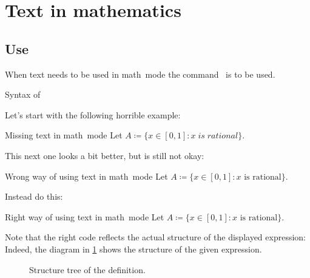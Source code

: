 \section{Text in mathematics}


\subsection{Use }

When text needs to be used in math~mode the command~ is to be used.
\begin{showcode}{Syntax of }
\end{showcode}
Let’s start with the following horrible example:
\begin{showlatex}{Missing text in math~mode}
Let $A \coloneqq \{ x \in [0,1] : x \; is \; rational \}$.
\end{showlatex}
This next one looks a bit better, but is still not okay:
\begin{showlatex}[label = {wrong math mode position}]{Wrong way of using text in math~mode}
Let $A \coloneqq \{ x \in [0,1] : x \text{ is rational} \}$.
\end{showlatex}
Instead do this:
\begin{showlatex}[label = {right math mode position}]{Right way of using text in math~mode}
Let $A \coloneqq \{ x \in [0,1] : \text{$x$ is rational} \}$.
\end{showlatex}
Note that the right code reflects the actual structure of the displayed expression:
Indeed, the diagram in \cref{structure tree of definition} shows the structure of the given expression.
\begin{figure}[tb]
  \begin{center}
  \end{center}
  \caption{Structure tree of the definition.}
  \label{structure tree of definition}
\end{figure}
